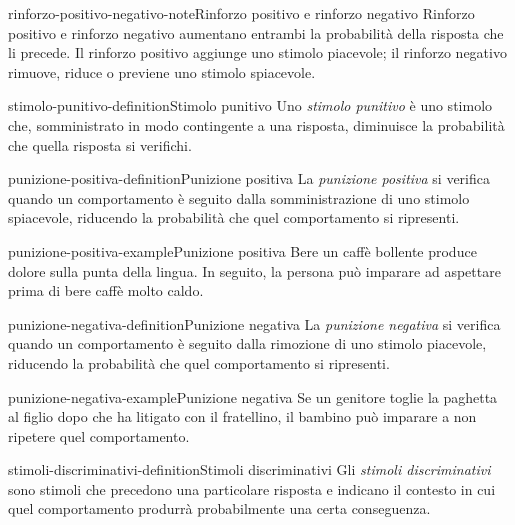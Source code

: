 \documentclass[preview]{standalone}
\begin{document}
\begin{snippetnote}{rinforzo-positivo-negativo-note}{Rinforzo positivo e rinforzo negativo}
    Rinforzo positivo e rinforzo negativo aumentano entrambi la probabilità
    della risposta che li precede. Il rinforzo positivo aggiunge uno stimolo
    piacevole; il rinforzo negativo rimuove, riduce o previene uno stimolo
    spiacevole.
\end{snippetnote}

\begin{snippetdefinition}{stimolo-punitivo-definition}{Stimolo punitivo}
    Uno \emph{stimolo punitivo} è uno stimolo che, somministrato in modo
    contingente a una risposta, diminuisce la probabilità che quella risposta si
    verifichi.
\end{snippetdefinition}

\begin{snippetdefinition}{punizione-positiva-definition}{Punizione positiva}
    La \emph{punizione positiva} si verifica quando un comportamento è seguito
    dalla somministrazione di uno stimolo spiacevole, riducendo la probabilità
    che quel comportamento si ripresenti.
\end{snippetdefinition}

\begin{snippetexample}{punizione-positiva-example}{Punizione positiva}
    Bere un caffè bollente produce dolore sulla punta della lingua. In seguito,
    la persona può imparare ad aspettare prima di bere caffè molto caldo.
\end{snippetexample}

\begin{snippetdefinition}{punizione-negativa-definition}{Punizione negativa}
    La \emph{punizione negativa} si verifica quando un comportamento è seguito
    dalla rimozione di uno stimolo piacevole, riducendo la probabilità che quel
    comportamento si ripresenti.
\end{snippetdefinition}

\begin{snippetexample}{punizione-negativa-example}{Punizione negativa}
    Se un genitore toglie la paghetta al figlio dopo che ha litigato con il
    fratellino, il bambino può imparare a non ripetere quel comportamento.
\end{snippetexample}

\begin{snippetdefinition}{stimoli-discriminativi-definition}{Stimoli discriminativi}
    Gli \emph{stimoli discriminativi} sono stimoli che precedono una particolare
    risposta e indicano il contesto in cui quel comportamento produrrà
    probabilmente una certa conseguenza.
\end{snippetdefinition}
\end{document}

